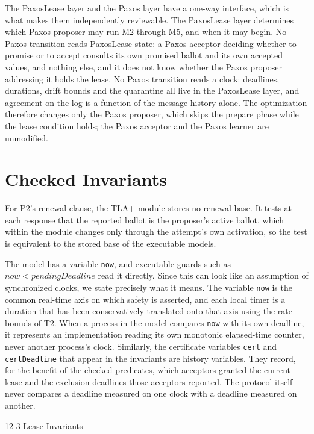 \documentclass[final,5p,times,twocolumn,number]{elsarticle}
\makeatletter
\newcommand{\code}[1]{\texttt{#1}}
\renewcommand\subsection{\@startsection{subsection}{2}{\z@}%
           {12\p@ \@plus 6\p@ \@minus 3\p@}%
           {3\p@ \@plus 6\p@ \@minus 3\p@}%
           {\normalfont\normalsize\bfseries}}
\makeatother
\begin{document}
The PaxosLease layer and the Paxos layer have a one-way interface, which is what makes them independently reviewable.  The PaxosLease layer determines which Paxos proposer may run M2 through M5, and when it may begin.  No Paxos transition reads PaxosLease state: a Paxos acceptor deciding whether to promise or to accept consults its own promised ballot and its own accepted values, and nothing else, and it does not know whether the Paxos proposer addressing it holds the lease.  No Paxos transition reads a clock: deadlines, durations, drift bounds and the quarantine all live in the PaxosLease layer, and agreement on the log is a function of the message history alone.  The optimization therefore changes only the Paxos proposer, which skips the prepare phase while the lease condition holds; the Paxos acceptor and the Paxos learner are unmodified.

\section{Checked Invariants}\label{app:invariants}

For P2's renewal clause, the TLA+ module stores no renewal base.  It tests at each response that the reported ballot is the proposer's active ballot, which within the module changes only through the attempt's own activation, so the test is equivalent to the stored base of the executable models.

The model has a variable \code{now}, and executable guards such as $now < pendingDeadline$ read it directly.  Since this can look like an assumption of synchronized clocks, we state precisely what it means.  The variable \code{now} is the common real-time axis on which safety is asserted, and each local timer is a duration that has been conservatively translated onto that axis using the rate bounds of T2.  When a process in the model compares \code{now} with its own deadline, it represents an implementation reading its own monotonic elapsed-time counter, never another process's clock.  Similarly, the certificate variables \code{cert} and \code{certDeadline} that appear in the invariants are history variables.  They record, for the benefit of the checked predicates, which acceptors granted the current lease and the exclusion deadlines those acceptors reported.  The protocol itself never compares a deadline measured on one clock with a deadline measured on another.

\subsection{Lease Invariants}
\end{document}
